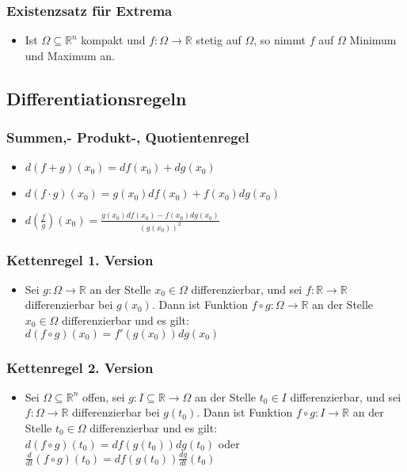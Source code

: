 \documentclass[a3paper, 11pt, landscape]{scrartcl}
\newcommand{\Rn}{\mathbb{R}^n}
\begin{document}
\begin{multicols*}{3}
    \subsubsection{Existenzsatz für Extrema}
        \begin{itemize}
            \item Ist $\Omega\subseteq\Rn$ kompakt und $f:\Omega\to\mathbb{R}$ stetig auf $\Omega$, so nimmt $f$ auf $\Omega$ Minimum und Maximum an.
        \end{itemize}
	
	\subsection{Differentiationsregeln}
	\subsubsection{Summen,- Produkt-, Quotientenregel}
	\begin{itemize}
	    \item $d(f+g)(x_0)=df(x_0)+dg(x_0)$
	    \item $d(f\cdot g)(x_0)=g(x_0)df(x_0)+f(x_0)dg(x_0)$
	    \item $d(\frac{f}{g})(x_0)=\frac{g(x_0)df(x_0)-f(x_0)dg(x_0)}{(g(x_0))^2}$
	\end{itemize}
	
	\subsubsection{Kettenregel 1. Version}
	\begin{itemize}
	    \item Sei $g:\Omega\to\mathbb{R}$ an der Stelle $x_0\in\Omega$ differenzierbar, und sei $f:\mathbb{R}\to\mathbb{R}$ differenzierbar bei $g(x_0)$. Dann ist Funktion $f\circ g:\Omega\to\mathbb{R}$ an der Stelle $x_0\in\Omega$ differenzierbar und es gilt:\\
	    $d(f\circ g)(x_0)=f'(g(x_0))dg(x_0)$
	\end{itemize}
	
	\subsubsection{Kettenregel 2. Version}
	\begin{itemize}
	    \item Sei $\Omega\subseteq\Rn$ offen, sei $g:I\subseteq\mathbb{R}\to\Omega$ an der Stelle $t_0\in I$ differenzierbar, und sei $f:\Omega\to\mathbb{R}$ differenzierbar bei $g(t_0)$. Dann ist Funktion $f\circ g:I\to\mathbb{R}$ an der Stelle $t_0\in\Omega$ differenzierbar und es gilt:\\
	    $d(f\circ g)(t_0)=df(g(t_0))dg(t_0)$ oder\\
	    $\frac{d}{dt}(f\circ g)(t_0)=df(g(t_0))\frac{dg}{dt}(t_0)$
	\end{itemize}
		

\end{multicols*}
\end{document}
